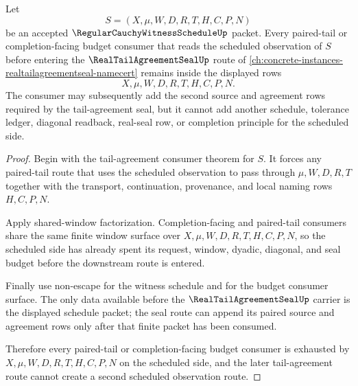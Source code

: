 \begin{theorem}
\label{thm:regular-cauchy-witness-schedule-tail-budget-exhaustion}
Let
$$
S=(X,\mu,W,D,R,T,H,C,P,N)
$$
be an accepted $\RegularCauchyWitnessScheduleUp$ packet. Every paired-tail or completion-facing budget consumer that reads the scheduled observation of $S$ before entering the $\RealTailAgreementSealUp$ route of \autoref{ch:concrete-instances-realtailagreementseal-namecert} remains inside the displayed rows
$$
X,\mu,W,D,R,T,H,C,P,N.
$$
The consumer may subsequently add the second source and agreement rows required by the tail-agreement seal, but it cannot add another schedule, tolerance ledger, diagonal readback, real-seal row, or completion principle for the scheduled side.
\end{theorem}
\begin{proof}
Begin with the tail-agreement consumer theorem for $S$. It forces any paired-tail route that uses the scheduled observation to pass through $\mu,W,D,R,T$ together with the transport, continuation, provenance, and local naming rows $H,C,P,N$.

Apply shared-window factorization. Completion-facing and paired-tail consumers share the same finite window surface over $X,\mu,W,D,R,T,H,C,P,N$, so the scheduled side has already spent its request, window, dyadic, diagonal, and seal budget before the downstream route is entered.

Finally use non-escape for the witness schedule and for the budget consumer surface. The only data available before the $\RealTailAgreementSealUp$ carrier is the displayed schedule packet; the seal route can append its paired source and agreement rows only after that finite packet has been consumed.

Therefore every paired-tail or completion-facing budget consumer is exhausted by $X,\mu,W,D,R,T,H,C,P,N$ on the scheduled side, and the later tail-agreement route cannot create a second scheduled observation route.
\end{proof}

